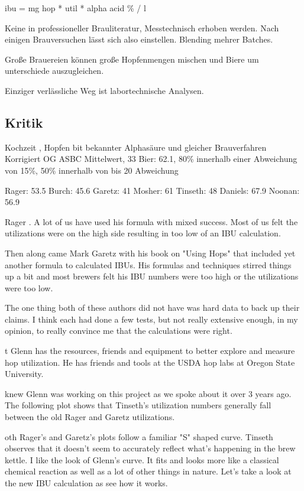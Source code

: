 \documentclass[a4paper,parskip=half]{scrartcl}
\begin{document}
\parencite[51]{Holle2010}
ibu = mg hop * util * alpha acid \% / l

\parencite[127]{Garetz1994} 
Keine in professioneller Brauliteratur, Messtechnisch erhoben
werden. Nach einigen Brauversuchen lässt sich also einstellen.
Blending mehrer Batches.

\parencite[76]{Daniels1996}
Große Brauereien können große Hopfenmengen mischen und
Biere um unterschiede auszugleichen.

\parencite[51]{Holle2010}
Einziger verlässliche Weg ist labortechnische Analysen.



\subsection*{Kritik}






\parencite{Bonham2001}
Kochzeit , Hopfen bit bekannter Alphasäure und gleicher Brauverfahren
Korrigiert OG
ASBC Mittelwert, 33 Bier: 62.1, 80\% innerhalb einer Abweichung von 15\%, 50\% innerhalb
von  bis 20 Abweichung

Rager: 53.5
Burch: 45.6
Garetz: 41
Mosher: 61
Tinseth: 48
Daniels: 67.9
Noonan: 56.9

\parencite{Jones1995}
Rager
. A lot of us have used his formula with mixed success. Most of us felt
the utilizations were on the high side resulting in too low of an IBU calculation.

Then along came Mark Garetz with his book on "Using Hops" that included yet another formula to
calculated IBUs. His formulas and techniques stirred things up a bit and most brewers felt his IBU
numbers were too high or the utilizations were too low.

The one thing both of these authors did not have was hard data to back up their claims. I think each had
done a few tests, but not really extensive enough, in my opinion, to really convince me that the
calculations were right.

t Glenn has the resources, friends
and equipment to better explore and measure hop utilization. He has friends and tools at the USDA hop
labs at Oregon State University.

knew Glenn was working on this project as we spoke about it over 3 years ago.
The following plot shows that Tinseth's utilization numbers generally fall between the
old Rager and Garetz utilizations.

oth Rager’s and Garetz’s plots follow a familiar "S" shaped curve. Tinseth observes that
it doesn't seem to accurately reflect what's happening in the brew kettle.
I like the look of Glenn's curve. It fits and looks more like a classical chemical reaction as well as a lot of
other things in nature. Let’s take a look at the new IBU calculation as see how it works.
\end{document}
